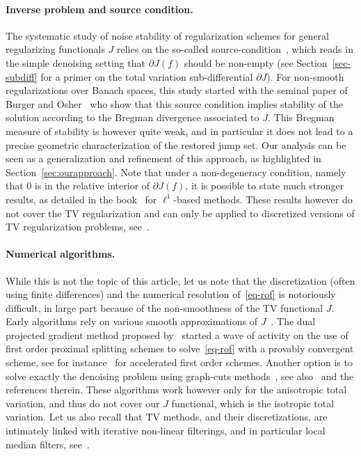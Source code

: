 \paragraph{Inverse problem and source condition.}

The systematic study of noise stability of regularization schemes for general regularizing functionals $J$ relies on the so-called source-condition~\cite{ScherzerBook09}, which reads in the simple denoising setting that $\partial J(f)$ should be non-empty (see Section~\ref{sec-subdiff} for a primer on the total variation sub-differential $\partial J$). For non-smooth regularizations over Banach spaces, this study started with the seminal paper of Burger and Osher~\cite{burger2004convergence} who show that this source condition implies stability of the solution according to the Bregman divergence associated to $J$. This Bregman measure of stability is however quite weak, and in particular it does not lead to a precise geometric characterization of the restored jump set. Our analysis can be seen as a generalization and refinement of this approach, as highlighted in Section~\ref{sec:ourapproach}. Note that under a non-degeneracy condition, namely that $0$ is in the relative interior of $\partial J(f)$, it is possible to state much stronger results, as detailed in the book~\cite{ScherzerBook09} for $\ell^1$-based methods. These results however do not cover the TV regularization and can only be applied to discretized versions of TV regularization problems, see~\cite{VaiterPDF13}. 


\paragraph{Numerical algorithms.}

While this is not the topic of this article, let us note that the discretization (often using finite differences) and the numerical resolution of~\eqref{eq-rof} is notoriously difficult, in large part because of the non-smoothness of the TV functional $J$. 
%
Early algorithms rely on various smooth approximations of $J$~\cite{VogelOman,ChambolleLions}. 
%
The dual projected gradient method proposed by~\cite{chambolle2004algorithm} started a wave of activity on the use of first order proximal splitting schemes to solve~\eqref{eq-rof} with a provably convergent scheme, see for instance~\cite{BeckTeboulle} for accelerated first order schemes. 
%
Another option is to solve exactly the denoising problem using graph-cuts methods~\cite{Hochbaum2001}, see also~\cite{KolmogorovZabin,DarbonSigelle,ChambolleDarbon2009} and the references therein. These algorithms work however only for the anisotropic total variation, and thus do not cover our $J$ functional, which is the isotropic total variation. 
%
Let us also recall that TV methods, and their discretizations, are intimately linked with iterative non-linear filterings, and in particular local median filters, see~\cite{Buades2006}. 

